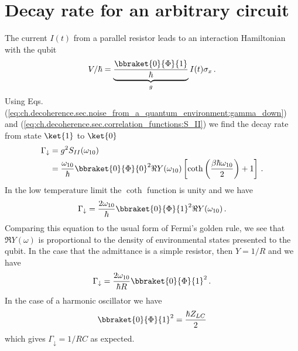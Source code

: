 \section{Decay rate for an arbitrary circuit}

The current $I(t)$ from a parallel resistor leads to an interaction Hamiltonian with the qubit
\begin{equation}
V / \hbar = \underbrace{\frac{\bbraket{0}{\Phi}{1}}{\hbar}}_g  I(t) \sigma_x \, .
\end{equation}
Using Eqs. (\ref{eq:ch.decoherence.sec.noise_from_a_quantum_environment:gamma_down}) and (\ref{eq:ch.decoherence.sec.correlation_functions:S_II}) we find the decay rate from state $\ket{1}$ to $\ket{0}$
\begin{align}
\Gamma_{\downarrow}
&= g^2 S_{II}(\omega_{10}) \\
&= \frac{\omega_{10}}{\hbar} \bbraket{0}{\Phi}{0}^2 \Re Y(\omega_{10}) \left[ \coth \left( \frac{\beta \hbar \omega_{10}}{2} \right) +1 \right] \, .
\end{align}
In the low temperature limit the $\coth$ function is unity and we have
\begin{equation}
\Gamma_\downarrow = \frac{2\omega_{10}}{\hbar} \bbraket{0}{\Phi}{1}^2 \Re Y(\omega_{10}) \, .
\end{equation}
Comparing this equation to the usual form of Fermi's golden rule, we see that $\Re Y(\omega)$ is proportional to the density of environmental states presented to the qubit.
In the case that the admittance is a simple resistor, then $Y = 1/R$ and we have
\begin{equation}
\Gamma_\downarrow = \frac{2\omega_{10}}{\hbar R} \bbraket{0}{\Phi}{1}^2 \, .
\end{equation}
In the case of a harmonic oscillator we have
\begin{equation}
\bbraket{0}{\Phi}{1}^2 = \frac{\hbar Z_{LC}}{2}
\end{equation}
which gives $\Gamma_\downarrow = 1 / RC$ as expected.

